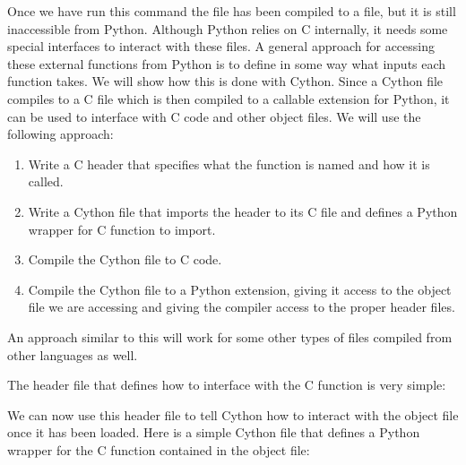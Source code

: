 Once we have run this command the file has been compiled to a \of file, but it is still inaccessible from Python.
Although Python relies on C internally, it needs some special interfaces to interact with these \of files.
A general approach for accessing these external functions from Python is to define in some way what inputs each function takes.
We will show how this is done with Cython.
Since a Cython file compiles to a C file which is then compiled to a callable extension for Python, it can be used to interface with C code and other object files.
We will use the following approach:
\begin{enumerate}
\item Write a C header that specifies what the function is named and how it is called.
\item Write a Cython file that imports the header to its C file and defines a Python wrapper for C function to import.
\item Compile the Cython file to C code.
\item Compile the Cython file to a Python extension, giving it access to the object file we are accessing and giving the compiler access to the proper header files.
\end{enumerate}

An approach similar to this will work for some other types of \of files compiled from other languages as well.

The header file that defines how to interface with the C function is very simple:



We can now use this header file to tell Cython how to interact with the object file once it has been loaded.
Here is a simple Cython file that defines a Python wrapper for the C function contained in the object file:



